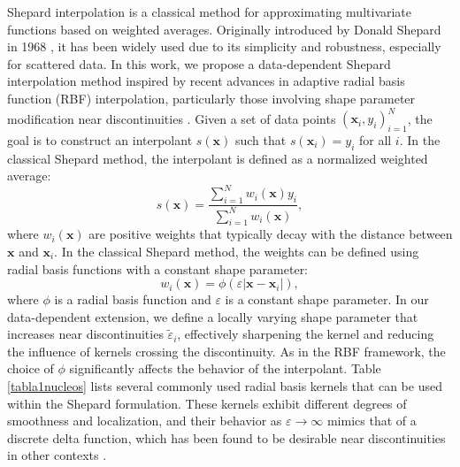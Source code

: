 \documentclass[preprint]{elsarticle}       %
\begin{document}
Shepard interpolation is a classical method for approximating multivariate functions based on weighted averages. Originally introduced by Donald Shepard in 1968 \cite{Shepard1968}, it has been widely used due to its simplicity and robustness, especially for scattered data. In this work, we propose a data-dependent Shepard interpolation method inspired by recent advances in adaptive radial basis function (RBF) interpolation, particularly those involving shape parameter modification near discontinuities \cite{RBF_arxiv}.
Given a set of data points ${(\mathbf{x}_i, y_i)}_{i=1}^N$, the goal is to construct an interpolant $s(\mathbf{x})$ such that $s(\mathbf{x}_i) = y_i$ for all $i$. In the classical Shepard method, the interpolant is defined as a normalized weighted average:
\begin{equation}\label{shepard1}
s(\mathbf{x}) = \frac{\displaystyle\sum_{i=1}^N w_i(\mathbf{x}) y_i}{\displaystyle\sum_{i=1}^N w_i(\mathbf{x})},
\end{equation}
where $w_i(\mathbf{x})$ are positive weights that typically decay with the distance between $\mathbf{x}$ and $\mathbf{x}_i$. In the classical Shepard method, the weights can be defined using radial basis functions with a constant shape parameter:
\begin{equation}\label{shepard2}
w_i(\mathbf{x}) = \phi(\varepsilon |\mathbf{x} - \mathbf{x}_i|),
\end{equation}
where $\phi$ is a radial basis function and $\varepsilon$ is a constant shape parameter.  In our data-dependent extension, we define a locally varying shape parameter that increases near discontinuities $\tilde\varepsilon_i$, effectively sharpening the kernel and reducing the influence of kernels crossing the discontinuity.
As in the RBF framework, the choice of $\phi$ significantly affects the behavior of the interpolant. Table \ref{tabla1nucleos} lists several commonly used radial basis kernels that can be used within the Shepard formulation. These kernels exhibit different degrees of smoothness and localization, and their behavior as $\varepsilon \to \infty$ mimics that of a discrete delta function, which has been found to be desirable near discontinuities in other contexts \cite{Jung2007, RBF_arxiv}.
\end{document}
